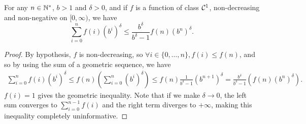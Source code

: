 \documentclass[12pt]{colt2018} %
\begin{document}
\begin{lemma}\label{lem:GeomWeightedSumIneq}
    For any $n \in \mathbb{N}^*$, $b > 1$ and $\delta > 0$,
    and if $f$ is a function of class $\mathcal{C}^1$, non-decreasing and non-negative on $[0, \infty)$,
    we have
    \begin{equation}
        \sum_{i=0}^{n} f(i) (b^i)^{\delta} \leq
        \frac{b^{\delta}}{b^{\delta} - 1} f(n) (b^n)^{\delta}.
    \end{equation}

\end{lemma}
\begin{proof}\label{proof:ineq2}
    By hypothesis, $f$ is non-decreasing, so $\forall i\in\{0,\dots,n\}, f(i) \leq f(n)$,
    and so by using the sum of a geometric sequence, we have
    \begin{align*}
        \sum_{i=0}^{n} f(i) (b^i)^{\delta}
        \leq f(n) \left( \sum_{i=0}^{n} (b^i)^{\delta} \right)
        \leq f(n) \frac{1}{b^{\delta} - 1} (b^{n+1})^{\delta}
        = \frac{b^{\delta}}{b^{\delta} - 1} \left( f(n) (b^n)^{\delta} \right).
    \end{align*}
    $f(i) = 1$ gives the geometric inequality.
    Note that if we make $\delta\to0$, the left sum converges to $\sum_{i=0}^{n-1} f(i)$ and the right term diverges to $+\infty$, making this inequality completely uninformative.
\end{proof}
\end{document}

